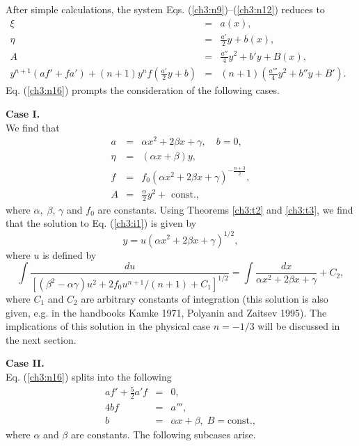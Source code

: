 After simple calculations, the system Eqs. (\ref{ch3:n9})--(\ref{ch3:n12}) reduces to
\begin{eqnarray}
\xi &=& a(x), \label{ch3:n13}\\
\eta &=& \frac{a'}{2}y+b(x), \label{ch3:n14}\\
A &=& \frac{a''}{4}y^2+b'y+B(x), \label{ch3:n15}\\
y^{n+1}(af'+fa')+(n+1)y^n f\left (\frac{a'}{2}y+b \right) &=&
(n+1)\left (\frac{a'''}{4}y^2+b''y+B'\right ).\;\;
\label{ch3:n16}
\end{eqnarray}
Eq. (\ref{ch3:n16}) prompts the consideration of the following cases. 

{\bf Case I. }\\
We find that
\begin{eqnarray}
a & = & \alpha x^2+2\beta x +\gamma ,\quad b=0 ,\label{ch3:n17}\\
\eta &= & (\alpha x+\beta)y, \label{ch3:n18}\\
f &=& f_0 (\alpha x^2+2\beta x+\gamma)^{-\frac{n+3}{2}}, \label{ch3:n19} \\ A
&=& \frac{\alpha}{2}y^2+\mbox{ const.},\label{ch3:n20} \end{eqnarray}
where $\alpha,\;\beta$, $\gamma$ and $f_0$ are constants.
Using Theorems \ref{ch3:t2} and
\ref{ch3:t3}, we find that the solution to Eq. (\ref{ch3:i1}) is given by
\begin{equation} y=u(\alpha x^2+2\beta x+\gamma)^{1/2}, \label{ch3:n21}
\end{equation} where $u$ is defined by \begin{equation} \int
\frac{du}{\left [ (\beta^2-\alpha \gamma)u^2+2f_0u^{n+1}/(n+1)+C_1 \right
]^{1/2}} =\int \frac{dx}{\alpha x^2+2\beta x+\gamma}  +C_2, \label{ch3:n22}
\end{equation} where $C_1$ and $C_2$ are arbitrary constants of
integration (this solution is also given, e.g. in
the handbooks Kamke 1971, Polyanin and Zaitsev 1995).
The implications of this solution in the physical case $n=-1/3$ will
be discussed in the next section.

{\bf Case II. }\\
Eq. (\ref{ch3:n16}) splits into the following 
\begin{eqnarray}
af'+\frac{5}{2}a'f &=& 0, \label{ch3:n23} \\
4bf &=& a''', \label{ch3:n24}\\
b &=& \alpha x+\beta , \; B =  \mbox{const.}, \label{ch3:n25}
\end{eqnarray}
where $\alpha$ and $\beta$ are constants. The following subcases arise. 


